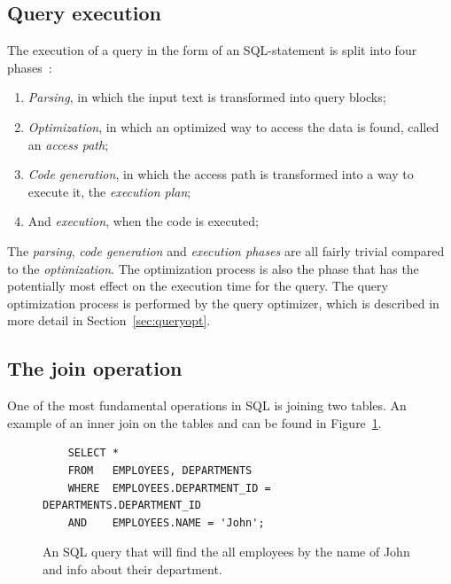 \subsection{Query execution}
The execution of a query in the form of an SQL-statement is split into four
phases~\cite{selinger_1979_access_apsiardms}:
\begin{enumerate}
\item \textit{Parsing}, in which the input text is transformed into query
  blocks;
\item \textit{Optimization}, in which an optimized way to access the data is
  found, called an \textit{access path};
\item \textit{Code generation}, in which the access path is transformed into a way to
  execute it, the \textit{execution plan};
\item And \textit{execution}, when the code is executed;
\end{enumerate}

The \textit{parsing}, \textit{code generation} and \textit{execution phases} are
all fairly trivial compared to the \textit{optimization}. The optimization
process is also the phase that has the potentially most effect on the execution
time for the query. The query optimization process is performed by the query
optimizer, which is described in more detail in Section~\ref{sec:queryopt}.

\subsection{The join operation}
One of the most fundamental operations in SQL is joining two tables. An
example of an inner join on the tables  and  can
be found in Figure~\ref{fig:sql:joinop}.

\begin{figure}[ht]
  \begin{verbatim}
    SELECT *
    FROM   EMPLOYEES, DEPARTMENTS
    WHERE  EMPLOYEES.DEPARTMENT_ID = DEPARTMENTS.DEPARTMENT_ID
    AND    EMPLOYEES.NAME = 'John';
  \end{verbatim}
  \caption[An example of an SQL query]{An SQL query that will find the all
    employees by the name of John and info about their
    department.}\label{fig:sql:joinop}
\end{figure}

